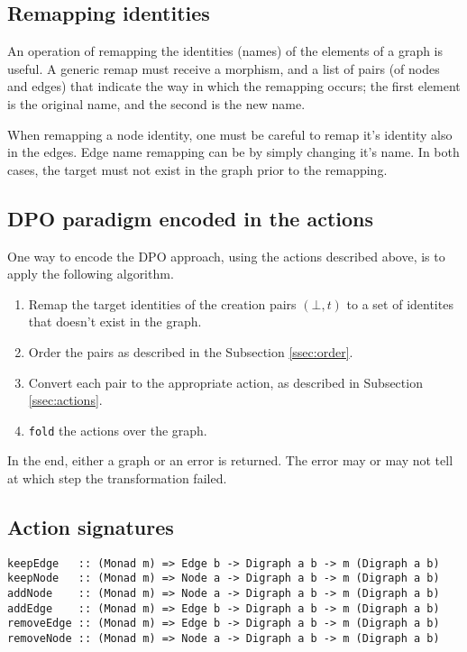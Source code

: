 \documentclass[a4paper]{report}
\begin{document}
\subsection{Remapping identities}
An operation of remapping the identities (names) of the elements of a graph is useful. A generic remap must receive a morphism, and a list of pairs (of nodes and edges) that indicate the way in which the remapping occurs; the first element is the original name, and the second is the new name.

When remapping a node identity, one must be careful to remap it's identity also in the edges. Edge name remapping can be by simply changing it's name. In both cases, the target must not exist in the graph prior to the remapping.

\subsection{DPO paradigm encoded in the actions}
One way to encode the DPO approach, using the actions described above, is to apply the following algorithm.

\begin{enumerate}
	\item Remap the target identities of the creation pairs $(\bot, t)$ to a set of identites that doesn't exist in the graph.
	\item Order the pairs as described in the Subsection \ref{ssec:order}.
	\item Convert each pair to the appropriate action, as described in Subsection \ref{ssec:actions}.
	\item \texttt{fold} the actions over the graph.
\end{enumerate}

In the end, either a graph or an error is returned. The error may or may not tell at which step the transformation failed.

\subsection{Action signatures}
\begin{verbatim}
keepEdge   :: (Monad m) => Edge b -> Digraph a b -> m (Digraph a b)
keepNode   :: (Monad m) => Node a -> Digraph a b -> m (Digraph a b)
addNode    :: (Monad m) => Node a -> Digraph a b -> m (Digraph a b)
addEdge    :: (Monad m) => Edge b -> Digraph a b -> m (Digraph a b)
removeEdge :: (Monad m) => Edge b -> Digraph a b -> m (Digraph a b)
removeNode :: (Monad m) => Node a -> Digraph a b -> m (Digraph a b)
\end{verbatim}
\end{document}
